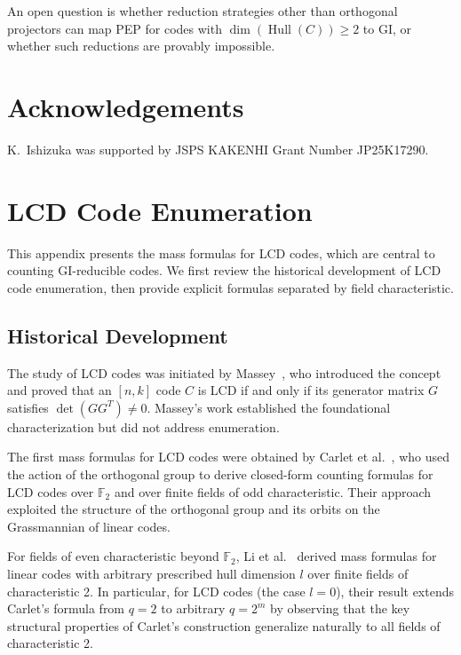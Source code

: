 \documentclass[11pt]{article}
\newcommand{\0}{\mathbf{0}}
\newcommand{\1}{\mathbf{1}}
\DeclareMathOperator{\Hull}{Hull}
\theoremstyle{plain}
\theoremstyle{definition}
\theoremstyle{remark}
\begin{document}
An open question is whether reduction strategies other than orthogonal projectors can map PEP for codes with $\dim(\Hull(C)) \geq 2$ to GI, or whether such reductions are provably impossible.

\section*{Acknowledgements}
K.~Ishizuka was supported by JSPS KAKENHI Grant Number JP25K17290.

\appendix

\section{LCD Code Enumeration}
\label{app:lcd_enumeration}

This appendix presents the mass formulas for LCD codes, which are central to counting GI-reducible codes. We first review the historical development of LCD code enumeration, then provide explicit formulas separated by field characteristic.

\subsection{Historical Development}

The study of LCD codes was initiated by Massey~\cite{massey1992linear}, who introduced the concept and proved that an $[n,k]$ code $C$ is LCD if and only if its generator matrix $G$ satisfies $\det(GG^T) \neq 0$. Massey's work established the foundational characterization but did not address enumeration.

The first mass formulas for LCD codes were obtained by Carlet et al.~\cite{carlet2019new}, who used the action of the orthogonal group to derive closed-form counting formulas for LCD codes over $\mathbb{F}_2$ and over finite fields of odd characteristic. Their approach exploited the structure of the orthogonal group and its orbits on the Grassmannian of linear codes.

For fields of even characteristic beyond $\mathbb{F}_2$, Li et al.~\cite{lishiling2025} derived mass formulas for linear codes with arbitrary prescribed hull dimension $l$ over finite fields of characteristic 2. In particular, for LCD codes (the case $l=0$), their result extends Carlet's formula from $q=2$ to arbitrary $q=2^m$ by observing that the key structural properties of Carlet's construction generalize naturally to all fields of characteristic 2.
\end{document}
